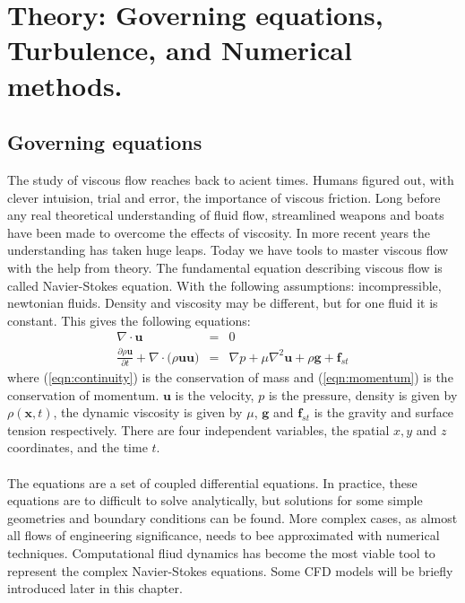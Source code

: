 \documentclass[a4paper, 12pt]{report}
\begin{document}
\chapter{Theory: Governing equations, Turbulence, and Numerical methods.}
\section{Governing equations}
The study of viscous flow reaches back to acient times. Humans figured out, with clever intuision, trial and error, the importance of viscous friction. Long before any real theoretical understanding of fluid flow, streamlined weapons and boats have been made to overcome the effects of viscosity. In more recent years the understanding has taken huge leaps. Today we have tools to master viscous flow with the help from theory. The fundamental equation describing viscous flow is called Navier-Stokes equation\cite{White}. With the following assumptions: incompressible, newtonian fluids. Density and viscosity may be different, but for one fluid it is constant. This gives the following equations:
\begin{eqnarray}
\label{eqn:continuity}
\nabla \cdot \mathbf{u} &=& 0 \\ 
\label{eqn:momentum}
\frac{\partial \rho \mathbf{u}}{\partial t} + \nabla \cdot \big(\rho \mathbf{u} \mathbf{u}\big) &=& \nabla p + \mu \nabla^2 \mathbf{u} + \rho\mathbf{g} + \mathbf{f}_{st} 
\end{eqnarray}
where (\ref{eqn:continuity}) is the conservation of mass and (\ref{eqn:momentum}) is the conservation of momentum. $\mathbf{u}$ is the velocity, $p$ is the pressure, density is given by $\rho(\mathbf{x},t)$, the dynamic viscosity is given by $\mu$, $\mathbf{g}$ and $\mathbf{f}_{st}$ is the gravity and surface tension respectively. There are four independent variables, the spatial $x, y$ and $z$ coordinates, and the time $t$.\\
\\
The equations are a set of coupled differential equations. In practice, these equations are to difficult to solve analytically, but solutions for some simple geometries and boundary conditions can be found. More complex cases, as almost all flows of engineering significance, needs to bee approximated with numerical techniques. Computational fliud dynamics has become the most viable tool to represent the complex Navier-Stokes equations. Some CFD models will be briefly introduced later in this chapter.\\
\\
\end{document}
